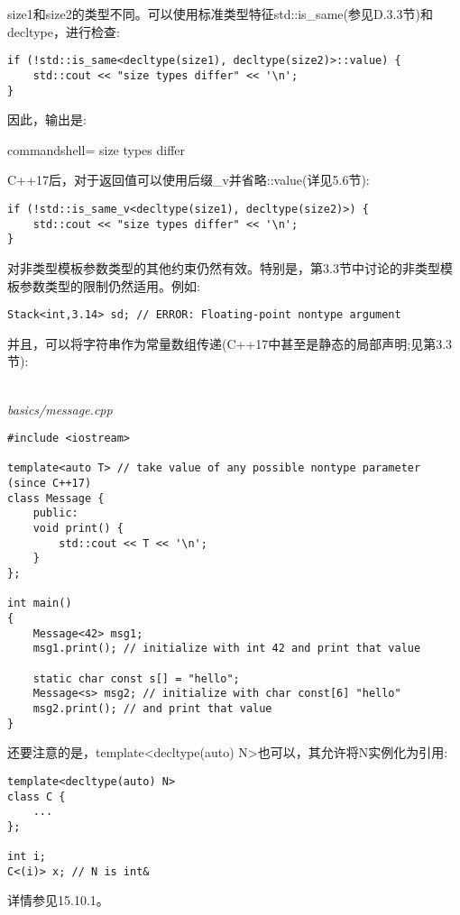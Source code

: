 size1和size2的类型不同。可以使用标准类型特征std::is\_same(参见D.3.3节)和decltype，进行检查:

\begin{lstlisting}[style=styleCXX]
if (!std::is_same<decltype(size1), decltype(size2)>::value) {
	std::cout << "size types differ" << '\n';
}
\end{lstlisting}

因此，输出是:

\begin{tcblisting}{commandshell={}}
size types differ
\end{tcblisting}

C++17后，对于返回值可以使用后缀\_v并省略::value(详见5.6节):

\begin{lstlisting}[style=styleCXX]
if (!std::is_same_v<decltype(size1), decltype(size2)>) {
	std::cout << "size types differ" << '\n';
}
\end{lstlisting}

对非类型模板参数类型的其他约束仍然有效。特别是，第3.3节中讨论的非类型模板参数类型的限制仍然适用。例如:

\begin{lstlisting}[style=styleCXX]
Stack<int,3.14> sd; // ERROR: Floating-point nontype argument
\end{lstlisting}

并且，可以将字符串作为常量数组传递(C++17中甚至是静态的局部声明;见第3.3节):

\hspace*{\fill} \\ %
\noindent
\textit{basics/message.cpp}
\begin{lstlisting}[style=styleCXX]
#include <iostream>

template<auto T> // take value of any possible nontype parameter (since C++17)
class Message {
	public:
	void print() {
		std::cout << T << '\n';
	}
};

int main()
{
	Message<42> msg1;
	msg1.print(); // initialize with int 42 and print that value
	
	static char const s[] = "hello";
	Message<s> msg2; // initialize with char const[6] "hello"
	msg2.print(); // and print that value
}
\end{lstlisting}

还要注意的是，template<decltype(auto) N>也可以，其允许将N实例化为引用:

\begin{lstlisting}[style=styleCXX]
template<decltype(auto) N>
class C {
	...
};

int i;
C<(i)> x; // N is int&
\end{lstlisting}

详情参见15.10.1。




